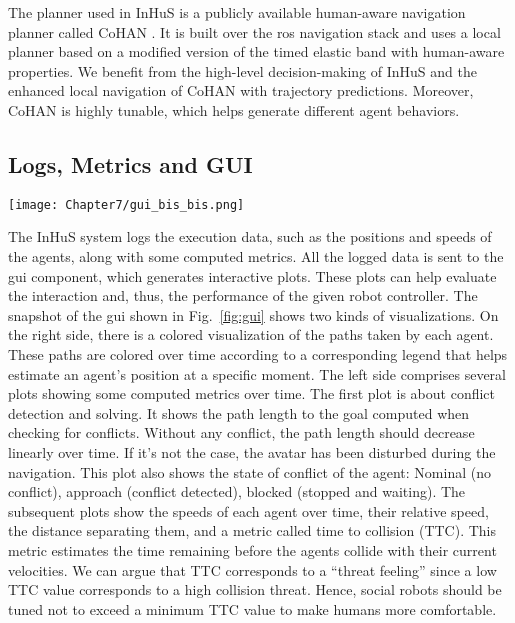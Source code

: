 The planner used in InHuS is a publicly available human-aware navigation planner called CoHAN \cite{singamaneni2021human}. It is built over the \acrshort{ros} navigation stack and uses a local planner based on a modified version of the timed elastic band with human-aware properties. 
We benefit from the high-level decision-making of InHuS and the enhanced local navigation of CoHAN with trajectory predictions. Moreover, CoHAN is highly tunable, which helps generate different agent behaviors. 

\subsection{Logs, Metrics and GUI} \label{sec:logs_metrics}

\begin{sidewaysfigure}
    \centering
    \texttt{[image: Chapter7/gui\_bis\_bis.png]}
    \caption{
    An overview of the \acrshort{gui} interface. On the right side, the paths taken by the agents are shown and colored over time. On the left side, several metrics and data produced by InHuS are plotted over time on graphs. Additional widgets help to configure the plots. 
    }
    \label{fig:gui}
\end{sidewaysfigure}

The InHuS system logs the execution data, such as the positions and speeds of the agents, along with some computed metrics. All the logged data is sent to the \acrshort{gui} component, which generates interactive plots. These plots can help evaluate the interaction and, thus, the performance of the given robot controller. The snapshot of the \acrshort{gui} shown in Fig.~\ref{fig:gui} shows two kinds of visualizations. On the right side, there is a colored visualization of the paths taken by each agent. These paths are colored over time according to a corresponding legend that helps estimate an agent's position at a specific moment. The left side comprises several plots showing some computed metrics over time. The first plot is about conflict detection and solving. It shows the path length to the goal computed when checking for conflicts. Without any conflict, the path length should decrease linearly over time. If it's not the case, the avatar has been disturbed during the navigation. This plot also shows the state of conflict of the agent: Nominal (no conflict), approach (conflict detected), blocked (stopped and waiting). The subsequent plots show the speeds of each agent over time, their relative speed, the distance separating them, 
and a metric called time to collision (TTC). This metric estimates the time remaining before the agents collide with their current velocities. We can argue that TTC corresponds to a ``threat feeling'' since a low TTC value corresponds to a high collision threat. Hence, social robots should be tuned not to exceed a minimum TTC value to make humans more comfortable.

